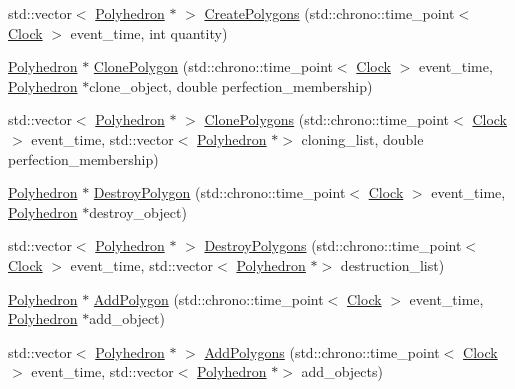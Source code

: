 \begin{DoxyCompactItemize}
\item 
std\+::vector$<$ \mbox{\hyperlink{classPolyhedron}{Polyhedron}} $\ast$ $>$ \mbox{\hyperlink{classPolyhedron_a1848eb8747c1132c40c2d27336af2896}{Create\+Polygons}} (std\+::chrono\+::time\+\_\+point$<$ \mbox{\hyperlink{universe_8h_a0ef8d951d1ca5ab3cfaf7ab4c7a6fd80}{Clock}} $>$ event\+\_\+time, int quantity)
\item 
\mbox{\hyperlink{classPolyhedron}{Polyhedron}} $\ast$ \mbox{\hyperlink{classPolyhedron_abfacad3a348785dab8819e70bf92d8d1}{Clone\+Polygon}} (std\+::chrono\+::time\+\_\+point$<$ \mbox{\hyperlink{universe_8h_a0ef8d951d1ca5ab3cfaf7ab4c7a6fd80}{Clock}} $>$ event\+\_\+time, \mbox{\hyperlink{classPolyhedron}{Polyhedron}} $\ast$clone\+\_\+object, double perfection\+\_\+membership)
\item 
std\+::vector$<$ \mbox{\hyperlink{classPolyhedron}{Polyhedron}} $\ast$ $>$ \mbox{\hyperlink{classPolyhedron_ab4f57da9595dc92de7340cc46237a2ea}{Clone\+Polygons}} (std\+::chrono\+::time\+\_\+point$<$ \mbox{\hyperlink{universe_8h_a0ef8d951d1ca5ab3cfaf7ab4c7a6fd80}{Clock}} $>$ event\+\_\+time, std\+::vector$<$ \mbox{\hyperlink{classPolyhedron}{Polyhedron}} $\ast$$>$ cloning\+\_\+list, double perfection\+\_\+membership)
\item 
\mbox{\hyperlink{classPolyhedron}{Polyhedron}} $\ast$ \mbox{\hyperlink{classPolyhedron_a2fcc5144ebc64363f40c31d2b980cfaf}{Destroy\+Polygon}} (std\+::chrono\+::time\+\_\+point$<$ \mbox{\hyperlink{universe_8h_a0ef8d951d1ca5ab3cfaf7ab4c7a6fd80}{Clock}} $>$ event\+\_\+time, \mbox{\hyperlink{classPolyhedron}{Polyhedron}} $\ast$destroy\+\_\+object)
\item 
std\+::vector$<$ \mbox{\hyperlink{classPolyhedron}{Polyhedron}} $\ast$ $>$ \mbox{\hyperlink{classPolyhedron_ae372d216765d48b9423ee37a8bf8b282}{Destroy\+Polygons}} (std\+::chrono\+::time\+\_\+point$<$ \mbox{\hyperlink{universe_8h_a0ef8d951d1ca5ab3cfaf7ab4c7a6fd80}{Clock}} $>$ event\+\_\+time, std\+::vector$<$ \mbox{\hyperlink{classPolyhedron}{Polyhedron}} $\ast$$>$ destruction\+\_\+list)
\item 
\mbox{\hyperlink{classPolyhedron}{Polyhedron}} $\ast$ \mbox{\hyperlink{classPolyhedron_a63bc509a87935cc25e541d2490c01d1f}{Add\+Polygon}} (std\+::chrono\+::time\+\_\+point$<$ \mbox{\hyperlink{universe_8h_a0ef8d951d1ca5ab3cfaf7ab4c7a6fd80}{Clock}} $>$ event\+\_\+time, \mbox{\hyperlink{classPolyhedron}{Polyhedron}} $\ast$add\+\_\+object)
\item 
std\+::vector$<$ \mbox{\hyperlink{classPolyhedron}{Polyhedron}} $\ast$ $>$ \mbox{\hyperlink{classPolyhedron_a9564a286e7323b56667971b851f0674a}{Add\+Polygons}} (std\+::chrono\+::time\+\_\+point$<$ \mbox{\hyperlink{universe_8h_a0ef8d951d1ca5ab3cfaf7ab4c7a6fd80}{Clock}} $>$ event\+\_\+time, std\+::vector$<$ \mbox{\hyperlink{classPolyhedron}{Polyhedron}} $\ast$$>$ add\+\_\+objects)
$$
\end{DoxyCompactItemize}
